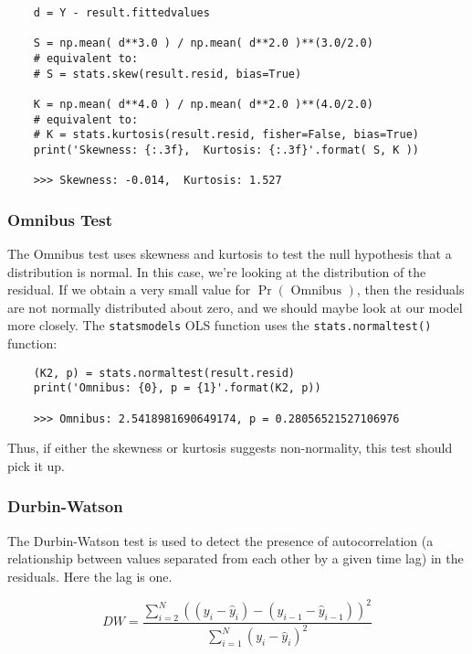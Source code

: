 \begin{lstlisting}
    d = Y - result.fittedvalues

    S = np.mean( d**3.0 ) / np.mean( d**2.0 )**(3.0/2.0)
    # equivalent to:
    # S = stats.skew(result.resid, bias=True)

    K = np.mean( d**4.0 ) / np.mean( d**2.0 )**(4.0/2.0)
    # equivalent to:
    # K = stats.kurtosis(result.resid, fisher=False, bias=True)
    print('Skewness: {:.3f},  Kurtosis: {:.3f}'.format( S, K ))

    >>> Skewness: -0.014,  Kurtosis: 1.527
\end{lstlisting}

\subsubsection{Omnibus Test}

The Omnibus test uses skewness and kurtosis to test the null hypothesis that a distribution is normal. In this case, we’re looking at the distribution of the residual. If we obtain a very small value for $\Pr( \mbox{ Omnibus } )$, then the residuals are not normally distributed about zero, and we should maybe look at our model more closely. The \lstinline{statsmodels} OLS function uses the \lstinline{stats.normaltest()} function:

\begin{lstlisting}
    (K2, p) = stats.normaltest(result.resid)
    print('Omnibus: {0}, p = {1}'.format(K2, p))

    >>> Omnibus: 2.5418981690649174, p = 0.28056521527106976
\end{lstlisting}

Thus, if either the skewness or kurtosis suggests non-normality, this test should pick it up.

\subsubsection{Durbin-Watson}

The Durbin-Watson test is used to detect the presence of autocorrelation (a relationship between values separated from each other by a given time lag) in the residuals. Here the lag is one.

\begin{equation}
 DW = \dfrac{ \displaystyle \sum_{i=2}^{N} ( ( y_{i} - \hat{y}_i ) - ( y_{i-1} - \hat{y}_{i-1} ) )^{2} }{ \displaystyle \sum_{i=1}^{N} ( y_{i} - \hat{y}_{i} )^{2}}
 \end{equation}


